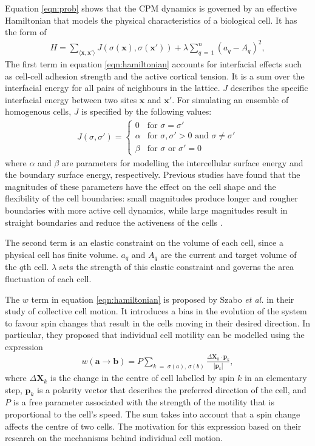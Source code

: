 \documentclass[a4paper,12pt]{article}
\newcommand{\abs}[1]{\left|#1\right|}
\newcommand{\inc}{\Delta}
\newcommand{\etal}{\textit{et al.} }
\begin{document}
Equation \ref{eqn:prob} shows that the CPM dynamics is governed by an effective Hamiltonian that models the physical characteristics of a biological cell. It has the form of 
\begin{eqnarray}
\label{eqn:hamiltonian}
H = \sum_{\langle{\bm{x}, \bm{x'}\rangle}} J\left(\sigma(\bm{x}), \sigma(\bm{x'})\right) + \lambda \sum_{q\,=\,1}^{n} \left(a_q - A_q\right)^2,
\end{eqnarray}
The first term in equation \ref{eqn:hamiltonian} accounts for interfacial effects such as cell-cell adhesion strength and the active cortical tension. It is a sum over the interfacial energy for all pairs of neighbours in the lattice. $J$ describes the specific interfacial energy between two sites $\bm{x}$ and $\bm{x'}$. For simulating an ensemble of homogenous cells, $J$ is specified by the following values:
\begin{eqnarray}
\label{eqn:interfacial_energy}
J(\sigma,\sigma') = \left\{
	\begin {array}{ll}
		0 & \textrm{for $\sigma = \sigma'$}\\
		\alpha & \textrm{for $\sigma, \sigma' > 0$ and $\sigma \neq \sigma'$}\\
		\beta & \textrm{for $\sigma$ or $\sigma' = 0$}
	\end{array}
\right.
\end{eqnarray}
where $\alpha$ and $\beta$ are parameters for modelling the intercellular surface energy and the boundary surface energy, respectively. Previous studies have found that the magnitudes of these parameters have the effect on the cell shape and the flexibility of the cell boundaries: small magnitudes produce longer and rougher boundaries with more active cell dynamics, while large magnitudes result in straight boundaries and reduce the activeness of the cells \cite{szabo2010}.

The second term is an elastic constraint on the volume of each cell, since a physical cell has finite volume. $a_q$ and $A_q$ are the current and target volume of the $q$th cell. $
\lambda$ sets the strength of this elastic constraint and governs the area fluctuation of each cell.

The $w$ term in equation \ref{eqn:hamiltonian} is proposed by Szabo \etal in their study of collective cell motion\cite{szabo2010}. It introduces a bias in the evolution of the system to favour spin changes that result in the cells moving in their desired direction. In particular, they proposed that individual cell motility can be modelled using the expression 
\begin{eqnarray}
w (\bm{a} \rightarrow \bm{b}) = P \sum_{k \;=\; \sigma(a),\,\sigma(b)} \frac{\inc \bm{X}_k \cdot \bm{p}_k}{\abs{\bm{p}_k}},
\end{eqnarray}
where $\inc \bm{X}_k$ is the change in the centre of cell labelled by spin $k$ in an elementary step, $\bm{p}_k$ is a polarity vector that describes the preferred direction of the cell, and $P$ is a free parameter associated with the strength of the motility that is proportional to the cell's speed. The sum takes into account that a spin change affects the centre of two cells. The motivation for this expression based on their research on the mechanisms behind individual cell motion. 
\end{document}
